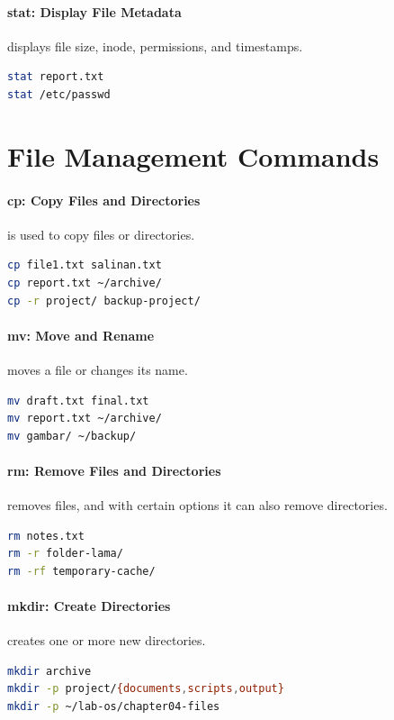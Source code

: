 \paragraph*{stat: Display File Metadata}
 displays file size, inode, permissions, and timestamps.
\begin{lstlisting}[language=bash]
stat report.txt
stat /etc/passwd
\end{lstlisting}

\section{File Management Commands}

\paragraph*{cp: Copy Files and Directories}
 is used to copy files or directories.
\begin{lstlisting}[language=bash]
cp file1.txt salinan.txt
cp report.txt ~/archive/
cp -r project/ backup-project/
\end{lstlisting}

\paragraph*{mv: Move and Rename}
 moves a file or changes its name.
\begin{lstlisting}[language=bash]
mv draft.txt final.txt
mv report.txt ~/archive/
mv gambar/ ~/backup/
\end{lstlisting}

\paragraph*{rm: Remove Files and Directories}
 removes files, and with certain options it can also remove directories.
\begin{lstlisting}[language=bash]
rm notes.txt
rm -r folder-lama/
rm -rf temporary-cache/
\end{lstlisting}

\paragraph*{mkdir: Create Directories}
 creates one or more new directories.
\begin{lstlisting}[language=bash]
mkdir archive
mkdir -p project/{documents,scripts,output}
mkdir -p ~/lab-os/chapter04-files
\end{lstlisting}

